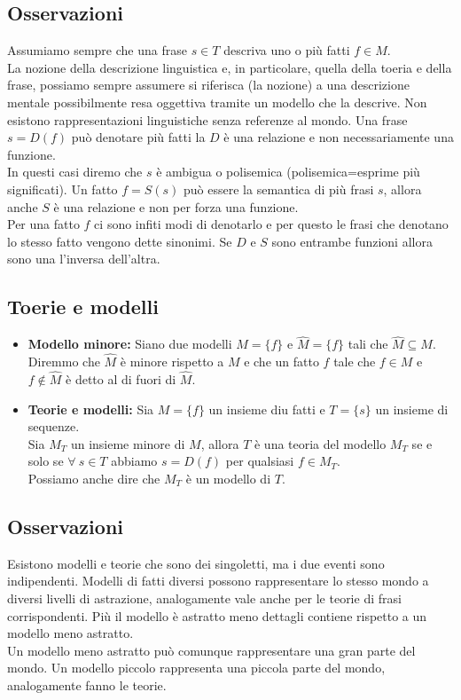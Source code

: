 \documentclass[../main.tex]{subfiles}
\newcommand{\spazio}{\vspace{1em} \newline}
\begin{document}
    \subsection{Osservazioni}
    Assumiamo sempre che una frase $s \in T$ descriva uno o più fatti $f \in M$.\\
    La nozione della descrizione linguistica e, in particolare, quella della toeria e della frase, possiamo sempre assumere si riferisca (la nozione) a una descrizione mentale possibilmente resa oggettiva tramite un modello che la descrive.
    \spazio
    Non esistono rappresentazioni linguistiche senza referenze al mondo.
    \spazio
    Una frase $s=D(f)$ può denotare più fatti la $D$ è una relazione e non necessariamente una funzione.\\
    In questi casi diremo che $s$ è ambigua o polisemica (polisemica=esprime più significati).
    \spazio
    Un fatto $f=S(s)$ può essere la semantica di più frasi $s$, allora anche $S$ è una relazione e non per forza una funzione.\\
    Per una fatto $f$ ci sono infiti modi di denotarlo e per questo le frasi che denotano lo stesso fatto vengono dette sinonimi.
    \spazio
    Se $D$ e $S$ sono entrambe funzioni allora sono una l'inversa dell'altra.

    \subsection{Toerie e modelli}
    \begin{itemize}
        \item \textbf{Modello minore:} Siano due modelli $M=\{f\}$ e $\widehat{M}=\{f\}$ tali che $\widehat{M}\subseteq M$.\\
            Diremmo che $\widehat{M}$ è minore rispetto a $M$ e che un fatto $f$ tale che $f \in M$ e $f \notin \widehat{M}$ è detto al di fuori di $\widehat{M}$.
        \item \textbf{Teorie e modelli:} Sia $M=\{f\}$ un insieme diu fatti e $T=\{s\}$ un insieme di sequenze.\\
            Sia $M_T$ un insieme minore di $M$, allora $T$ è una teoria del modello $M_T$ se e solo se $\forall\ s\in T$ abbiamo $s=D(f) $ per qualsiasi $f \in M_T$.\\
            Possiamo anche dire che $M_T$ è un modello di $T$. 
    \end{itemize}

    \subsection{Osservazioni}
    Esistono modelli e teorie che sono dei singoletti, ma i due eventi sono indipendenti.
    \spazio
    Modelli di fatti diversi possono rappresentare lo stesso mondo a diversi livelli di astrazione, analogamente vale anche per le teorie di frasi corrispondenti.
    \spazio
    Più il modello è astratto meno dettagli contiene rispetto a un modello meno astratto.\\
    Un modello meno astratto può comunque rappresentare una gran parte del mondo.
    \spazio
    Un modello piccolo rappresenta una piccola parte del mondo, analogamente fanno le teorie.
\end{document}

